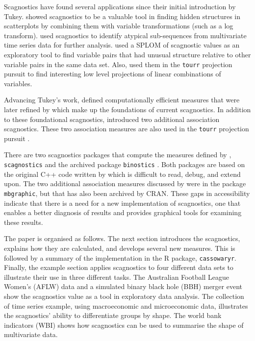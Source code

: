 Scagnostics have found several applications since their initial introduction by Tukey. \citet{hidscags} showed scagnostics to be a valuable tool in finding hidden structures in scatterplots by combining them with variable transformations (such as a log transform). \citet{timeseer} used scagnostics to identify atypical sub-sequences from multivariate time series data for further analysis. \citet{scagdist} used a SPLOM of scagnostic values as an exploratory tool to find variable pairs that had unusual structure relative to other variable pairs in the same data set. Also, \citet{tourrpp} used them in the \texttt{tourr} projection pursuit to find interesting low level projections of linear combinations of variables.

Advancing Tukey's work, \citet{scag} defined computationally efficient measures that were later refined by \citet{scagdist} which make up the foundations of current scagnostics. In addition to these foundational scagnostics, \citet{Grimm} introduced two additional association scagnostics. These two association measures are also used in the \texttt{tourr} projection pursuit \citep{tourrpp}.

There are two scagnostics packages that compute the measures defined by \citet{scag}, \texttt{scagnostics} \citep{scagdist} and the archived package \texttt{binostics} \citep{binostics}. Both packages are based on the original C++ code written by \citet{scagdist} which is difficult to read, debug, and extend upon. The two additional association measures discussed by \citet{Grimm} were in the package \texttt{mbgraphic}, but that has also been archived by CRAN. These gaps in accessibility indicate that there is a need for a new implementation of scagnostics, one that enables a better diagnosis of results and provides graphical tools for examining these results.

The paper is organised as follows. The next section introduces the scagnostics, explains how they are calculated, and develops several new measures. This is followed by a summary of the implementation in the R package, \texttt{cassowaryr}. Finally, the example section applies scagnostics to four different data sets to illustrate their use in three different tasks. The Australian Football League Women's (AFLW) data and a simulated binary black hole (BBH) merger event show the scagnostics value as a tool in exploratory data analysis. The collection of time series example, using macroeconomic and microeconomic data, illustrates the scagnostics' ability to differentiate groups by shape. The world bank indicators (WBI) shows how scagnostics can be used to summarise the shape of multivariate data.

